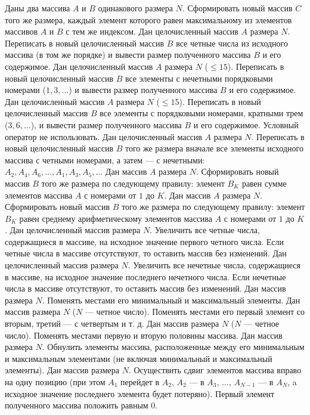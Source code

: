 Даны два массива $A$ и $B$ одинакового размера $N$. Сформировать новый массив $C$ того же размера, каждый элемент которого равен максимальному из элементов массивов $A$ и $B$ с тем же индексом.
Дан целочисленный массив $A$ размера $N$. Переписать в новый целочисленный массив $B$ все четные числа из исходного массива (в том же порядке) и вывести размер полученного массива $B$ и его содержимое.
Дан целочисленный массив $A$ размера $N$ ($\leq 15$). Переписать в новый целочисленный массив $B$ все элементы с нечетными порядковыми номерами ($1, 3, \dots$) и вывести размер полученного массива $B$ и его содержимое.
Дан целочисленный массив $A$ размера $N$ ($\leq 15$). Переписать в новый целочисленный массив $B$ все элементы с порядковыми номерами, кратными трем ($3, 6, \dots$), и вывести размер полученного массива $B$ и его содержимое. Условный оператор не использовать.
Дан целочисленный массив $A$ размера $N$. Переписать в новый целочисленный массив $B$ того же размера вначале все элементы исходного массива с четными номерами, а затем --- с нечетными: $A_2, A_4, A_6, \dots, A_1, A_3, A_5, \dots$
Дан массив $A$ размера $N$. Сформировать новый массив $B$ того же размера по следующему правилу: элемент $B_K$ равен сумме элементов массива $A$ с номерами от $1$ до $K$.
Дан массив $A$ размера $N$. Сформировать новый массив $B$ того же размера по следующему правилу: элемент $B_K$ равен среднему арифметическому элементов массива $A$ с номерами от $1$ до $K$.
Дан целочисленный массив размера $N$. Увеличить все четные числа, содержащиеся в массиве, на исходное значение первого четного числа. Если четные числа в массиве отсутствуют, то оставить массив без изменений.
Дан целочисленный массив размера $N$. Увеличить все нечетные числа, содержащиеся в массиве, на исходное значение последнего нечетного числа. Если нечетные числа в массиве отсутствуют, то оставить массив без изменений.
Дан массив размера $N$. Поменять местами его минимальный и максимальный элементы.
Дан массив размера $N$ ($N$ --- четное число). Поменять местами его первый элемент со вторым, третий --- с четвертым и т. д.
Дан массив размера $N$ ($N$ --- четное число). Поменять местами первую и вторую половины массива.
Дан массив размера $N$. Обнулить элементы массива, расположенные между его минимальным и максимальным элементами (не включая минимальный и максимальный элементы).
Дан массив размера $N$. Осуществить сдвиг элементов массива вправо на одну позицию (при этом $A_1$ перейдет в $A_2$, $A_2$ --- в $A_3$, $\dots$, $A_{N - 1}$ --- в $A_N$, a исходное значение последнего элемента будет потеряно). Первый элемент полученного массива положить равным $0$.
